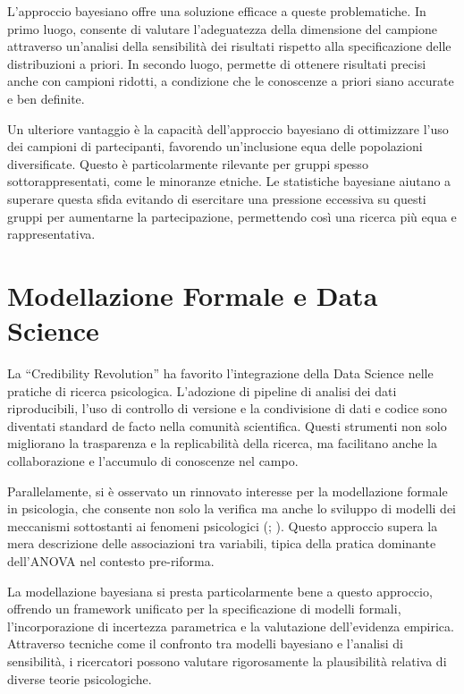 \documentclass[
  letterpaper,
]{krantz}
\begin{document}
L'approccio bayesiano offre una soluzione efficace a queste
problematiche. In primo luogo, consente di valutare l'adeguatezza della
dimensione del campione attraverso un'analisi della sensibilità dei
risultati rispetto alla specificazione delle distribuzioni a priori. In
secondo luogo, permette di ottenere risultati precisi anche con campioni
ridotti, a condizione che le conoscenze a priori siano accurate e ben
definite.

Un ulteriore vantaggio è la capacità dell'approccio bayesiano di
ottimizzare l'uso dei campioni di partecipanti, favorendo un'inclusione
equa delle popolazioni diversificate. Questo è particolarmente rilevante
per gruppi spesso sottorappresentati, come le minoranze etniche. Le
statistiche bayesiane aiutano a superare questa sfida evitando di
esercitare una pressione eccessiva su questi gruppi per aumentarne la
partecipazione, permettendo così una ricerca più equa e rappresentativa.

\section{Modellazione Formale e Data
Science}\label{modellazione-formale-e-data-science}

La ``Credibility Revolution'' ha favorito l'integrazione della Data
Science nelle pratiche di ricerca psicologica. L'adozione di pipeline di
analisi dei dati riproducibili, l'uso di controllo di versione e la
condivisione di dati e codice sono diventati standard de facto nella
comunità scientifica. Questi strumenti non solo migliorano la
trasparenza e la replicabilità della ricerca, ma facilitano anche la
collaborazione e l'accumulo di conoscenze nel campo.

Parallelamente, si è osservato un rinnovato interesse per la
modellazione formale in psicologia, che consente non solo la verifica ma
anche lo sviluppo di modelli dei meccanismi sottostanti ai fenomeni
psicologici (; ). Questo approccio supera la mera descrizione delle associazioni
tra variabili, tipica della pratica dominante dell'ANOVA nel contesto
pre-riforma.

La modellazione bayesiana si presta particolarmente bene a questo
approccio, offrendo un framework unificato per la specificazione di
modelli formali, l'incorporazione di incertezza parametrica e la
valutazione dell'evidenza empirica. Attraverso tecniche come il
confronto tra modelli bayesiano e l'analisi di sensibilità, i
ricercatori possono valutare rigorosamente la plausibilità relativa di
diverse teorie psicologiche.
\end{document}
